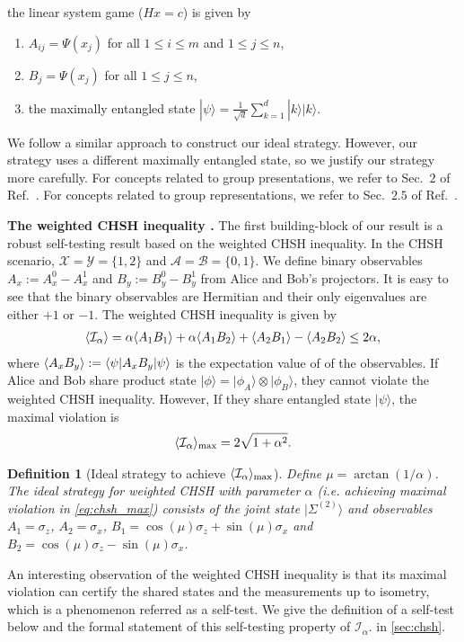 \documentclass[11pt,letterpaper]{article}
\newcommand{\ket}[1]{|#1\rangle}
\newcommand{\bra}[1]{\langle#1|}
\newcommand{\x}{\otimes}
\DeclarePairedDelimiter{\ip}{\langle}{\rangle}
\newcommand{\calX}{\mathcal{X}}
\newcommand{\calY}{\mathcal{Y}}
\newcommand{\calA}{\mathcal{A}}
\newcommand{\calB}{\mathcal{B}}
\newcommand{\1}{\mathbb{1}}
\newcommand{\EPR}[1]{\Sigma^{(#1)}}
\newcommand{\paulix}{\sigma_x}
\newcommand{\pauliz}{\sigma_z}
\newcommand{\I}{\mathcal{I}}
\newcommand{\sd}{\sqrt{d}}
\newtheorem{definition}[theorem]{Definition}
\theoremstyle{definition}
\begin{document}
the linear system game ($Hx = c$) is given by 
\begin{enumerate}
	\item $A_{ij} = \Psi(x_j)$ for all $ 1 \leq i \leq m$ and $1 \leq j \leq n$,
	\item $B_j = \Psi(x_j)$ for all $1 \leq j \leq n$,
	\item the maximally entangled state $\ket{\psi} = \frac{1}{\sd} \sum_{k=1}^d \ket{k}\ket{k}$.
\end{enumerate}
We follow a similar approach to construct our ideal strategy. However, our strategy uses a different maximally entangled state,
so we justify our strategy more carefully.
For concepts related to group presentations, we refer to Sec.~$2$ of Ref.~\cite{slofstra2017}.
For concepts related to group representations, we refer to Sec.~$2.5$ of Ref.~\cite{coladan2017}.


\textbf{The weighted CHSH inequality \cite{acin2012}.}
The first building-block of our result is a robust self-testing result based on the weighted CHSH inequality.
In the CHSH scenario, $\calX = \calY = \{1, 2\}$ and $\calA = \calB = \{0,1\}$.
We define binary observables $A_x := A_x^0 - A_x^1$ and $B_y := B_y^0 - B_y^1$ from Alice and Bob's projectors.
It is easy to see that the binary observables are Hermitian and their only eigenvalues are either $+1$ or $-1$.
The weighted CHSH inequality is given by 
\begin{align}
	\label{eq:chsh_op}
	\ip{\I_\alpha} = \alpha\ip{A_1B_1}+\alpha\ip{A_1B_2} + \ip{A_2B_1} - \ip{A_2B_2}\leq 2\alpha,
\end{align}
where $\ip{A_xB_y} := \bra{\psi} A_x B_y \ket{\psi}$ is the expectation value of of the observables. 
If Alice and Bob share product state $\ket{\phi} = \ket{\phi_A} \x \ket{\phi_B}$, they cannot violate
the weighted CHSH inequality.
However, If they share entangled state $\ket{\psi}$, the maximal violation is 
\begin{align}
\label{eq:chsh_max}
 \ip{\I_\alpha}_{\max} = 2\sqrt{1+\alpha^2}.
\end{align}
\begin{definition}[Ideal strategy to achieve $\ip{\I_\alpha}_{\max}$]
	\label{def:ideal}
	Define $\mu = \arctan(1/\alpha)$.
	The ideal strategy for weighted CHSH with parameter $\alpha$ (i.e. achieving maximal violation in \cref{eq:chsh_max})
	consists of the joint state $\ket{\EPR{2}}$ and observables $A_1 = \pauliz$, $A_2 = \paulix$,
	$B_1 = \cos(\mu) \pauliz+ \sin(\mu) \paulix$ and $B_2 = \cos(\mu) \pauliz - \sin(\mu) \paulix$.
\end{definition}
An interesting observation of the weighted CHSH inequality is that its maximal violation can certify the shared states and the 
measurements up to isometry, 
which is a phenomenon referred as a self-test.
We give the definition of a self-test below and the
formal statement of this self-testing property of $\I_\alpha$. in \cref{sec:chsh}.
\end{document}
